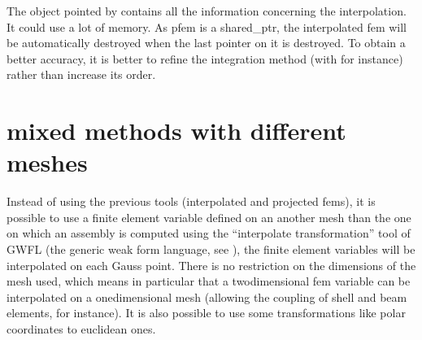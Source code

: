 \documentclass[a4paper,11pt,english]{sphinxmanual}
\begin{document}
\begin{sphinxVerbatim}[commandchars=\\\{\}]
 
    
   
 
   
\end{sphinxVerbatim}

The object pointed by  contains all the information concerning the
interpolation. It could use a lot of memory. As pfem is a shared\_ptr, the
interpolated fem will be automatically destroyed when the last pointer on it is
destroyed. To obtain a better accuracy, it is better to refine the integration
method (with  for instance) rather than increase its
order.


\section{mixed methods with different meshes}
\label{\detokenize{userdoc/interNMM:mixed-methods-with-different-meshes}}
Instead of using the previous tools (interpolated and projected fems), it is
possible to use a finite element variable defined on an another mesh than the one
on which an assembly is computed using the “interpolate transformation” tool
of GWFL (the generic weak form language, see {\hyperref[\detokenize{userdoc/gasm_high:ud-gasm-high-transf}]{}} ),
the finite element
variables will be interpolated on each Gauss point. There is no restriction
on the dimensions of the mesh used, which means in particular that a
two\sphinxhyphen{}dimensional fem variable can be interpolated on a one\sphinxhyphen{}dimensional mesh
(allowing the coupling of shell and beam elements, for instance).
It is also possible to use some transformations like polar coordinates to
euclidean ones.
\end{document}
